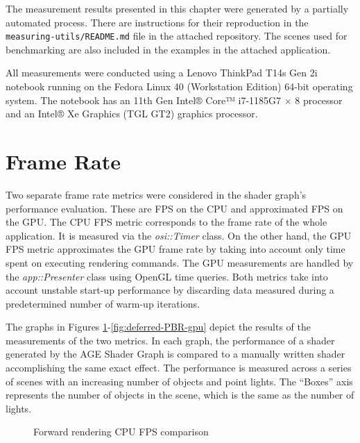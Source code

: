 \documentclass[
  digital,     %
  oneside,     %
  nosansbold,  %
  nocolorbold, %
  lof,         %
  lot,         %
]{fithesis4}
\begin{document}
The measurement results presented in this chapter were generated by a partially automated
process. There are instructions for their reproduction in the \verb|measuring-utils/README.md|
file in the attached repository. The scenes used for benchmarking are also included in the
examples in the attached application.

All measurements were conducted using a Lenovo ThinkPad T14s Gen 2i notebook running on
the Fedora Linux 40 (Workstation Edition) 64-bit operating system.
The notebook has an 11th Gen Intel® Core™ i7-1185G7 × 8 processor and an Intel® Xe Graphics (TGL GT2)
graphics processor.


\section{Frame Rate}
Two separate frame rate metrics were considered in the shader graph's performance
evaluation. These are FPS on the CPU and approximated FPS on the GPU.
The CPU FPS metric corresponds to the frame rate of the whole application.
It is measured via the \textit{osi::Timer} class.
On the other hand, the GPU FPS metric approximates the GPU frame rate by taking into account only time
spent on executing rendering commands. The GPU measurements are handled by the \textit{app::Presenter} class
using OpenGL time queries. Both metrics take into account unstable start-up performance by discarding
data measured during a predetermined number of warm-up iterations.

The graphs in Figures \ref{fig:forward-cpu}-\ref{fig:deferred-PBR-gpu} depict the results of the
measurements of the two metrics. In each graph, the performance of a shader generated by the
AGE Shader Graph is compared to a manually written shader accomplishing the same exact effect.
The performance is measured across a series of scenes with an increasing number of objects
and point lights. The \enquote{Boxes} axis represents the number of objects in the scene,
which is the same as the number of lights.

\begin{figure}[H]
    \centering
    \caption{Forward rendering CPU FPS comparison}
    \label{fig:forward-cpu}
\end{figure}
\end{document}

